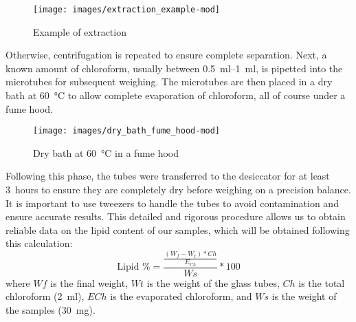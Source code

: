 \begin{figure}[H]
	\centering
	\texttt{[image: images/extraction\_example-mod]}
	\caption{Example of  extraction}
	\label{fig:extraction_example}
\end{figure}

Otherwise, centrifugation is repeated to ensure complete separation. Next, a known amount of chloroform, usually between \qtyrange{0.5}{1}{\milli\litre}, is pipetted into the microtubes for subsequent weighing. The microtubes are then placed in a dry bath at \qty{60}{\degreeCelsius}  to allow complete evaporation of chloroform, all of course under a fume hood.

\begin{figure}[H]
	\centering
	\texttt{[image: images/dry\_bath\_fume\_hood-mod]}
	\caption{Dry bath at \qty{60}{\degreeCelsius} in a fume hood}
	\label{fig:dry_bath_fume_hood}
\end{figure}

Following this phase, the tubes were transferred to the desiccator for at least \qty{3}{hours} to ensure they are completely dry before weighing on a precision balance. It is important to use tweezers to handle the tubes to avoid contamination and ensure accurate results. This detailed and rigorous procedure allows us to obtain reliable data on the lipid content of our samples, which will be obtained following this calculation:\zxriv{}
\[
	\text{Lipid \%}
	=
	\frac
		{\frac{(W_f - W_t) * Ch}{E_{Ch}}}
		{Ws}
		* 100
\]
where $ Wf $ is the final weight, $ Wt $ is the weight of the glass tubes, $ Ch $ is the total chloroform (\qty{2}{\milli\litre}), $ ECh $ is the evaporated chloroform, and $ Ws $ is the weight of the samples (\qty{30}{\milli\gram}).

